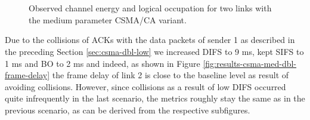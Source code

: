 \begin{figure}[tb]
	\label{fig:results-csma-med-dbl-channel-meta}
	\begin{center}
		\\
		\\
	\end{center}
	\caption{Observed channel energy and logical occupation for two links with the medium parameter CSMA/CA variant.}
\end{figure}

Due to the collisions of ACKs with the data packets of sender 1 as described in the preceding Section \ref{sec:csma-dbl-low} we increased DIFS to 9 ms, kept SIFS to 1 ms and BO to 2 ms and indeed, as shown in Figure \ref{fig:results-csma-med-dbl-frame-delay} the frame delay of link 2 is close to the baseline level as result of avoiding collisions. However, since collisions as a result of low DIFS occurred quite infrequently in the last scenario, the metrics roughly stay the same as in the previous scenario, as can be derived from the respective subfigures.

